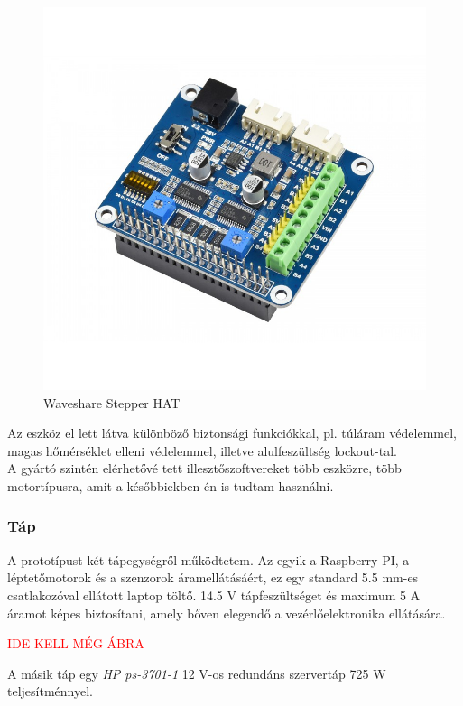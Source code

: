 \documentclass[12pt,a4paper]{article}
\newcommand{\ABRAKELL}{\textcolor{red}{IDE KELL MÉG ÁBRA}}
\begin{document}
\begin{figure}[h!]
	\centering
	\includegraphics[width=1\linewidth]{elek_stepperhat}
	\caption{Waveshare Stepper HAT}
	\label{fig:elek_stepperhat}
\end{figure}

Az eszköz el lett látva különböző biztonsági funkciókkal, pl. túláram védelemmel, magas hőmérséklet elleni védelemmel, illetve alulfeszültség lockout-tal.\\

A gyártó szintén elérhetővé tett illesztőszoftvereket több eszközre, több motortípusra, amit a későbbiekben én is tudtam használni.

\subsubsection*{Táp}

A prototípust két tápegységről működtetem. Az egyik a Raspberry PI, a léptetőmotorok és a szenzorok áramellátásáért, ez egy standard 5.5 mm-es csatlakozóval ellátott laptop töltő. 14.5 V tápfeszültséget és maximum 5 A áramot képes biztosítani, amely bőven elegendő a vezérlőelektronika ellátására.

\ABRAKELL

A másik táp egy \textsl{HP ps-3701-1} 12 V-os redundáns szervertáp 725 W teljesítménnyel. 
\end{document}
